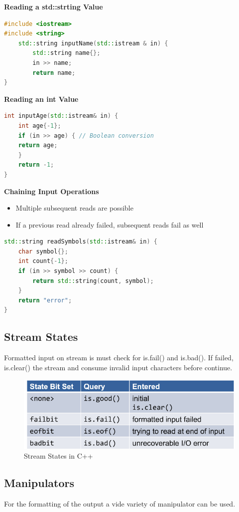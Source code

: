 \textbf{Reading a std::strting Value }
\begin{lstlisting}[language=C++]
#include <iostream> 
#include <string>
	std::string inputName(std::istream & in) {
		std::string name{};
		in >> name;
		return name; 
}	
\end{lstlisting}
\textbf{Reading an int Value}
\begin{lstlisting}[language=C++]
int inputAge(std::istream& in) {
	int age{-1};
	if (in >> age) { // Boolean conversion
	return age; 
	} 
	return -1;
}
\end{lstlisting}
\textbf{Chaining Input Operations}
\begin{itemize}
  \itemsep -0.5em 
  \item Multiple subsequent reads are possible 
  \item If a previous read already failed, subsequent reads fail as well
\end{itemize}

\begin{lstlisting}[language=C++]
std::string readSymbols(std::istream& in) {
	char symbol{};
	int count{-1};
	if (in >> symbol >> count) {
		return std::string(count, symbol); 
	} 
	return "error";
}
\end{lstlisting}

\subsection{Stream States}
Formatted input on stream  is must check for is.fail() and is.bad(). If failed, is.clear() the stream and consume invalid input characters before continue.

\begin{figure}[h!]
  \centering
  \includegraphics[width=0.7\linewidth]{images/streamstates}
  \caption{Stream States in C++}
\end{figure}

\subsection{Manipulators}
For the formatting of the output a vide variety of manipulator can be used.


\pagebreak
